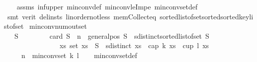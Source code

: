\begin{isabellebody}
%
\isadelimproof
\ \ %
\endisadelimproof
%
\isatagproof
{}\isamarkupfalse%
\ assms\ inf{\isacharunderscore}{\kern0pt}upper\ min{\isacharunderscore}{\kern0pt}conv{\isacharunderscore}{\kern0pt}def\ min{\isacharunderscore}{\kern0pt}conv{\isacharunderscore}{\kern0pt}leImpe\ min{\isacharunderscore}{\kern0pt}conv{\isacharunderscore}{\kern0pt}set{\isacharunderscore}{\kern0pt}def\isanewline
\ \ \isamarkupfalse%
\ {\isacharparenleft}{\kern0pt}smt\ {\isacharparenleft}{\kern0pt}verit{\isacharcomma}{\kern0pt}\ del{\isacharunderscore}{\kern0pt}insts{\isacharparenright}{\kern0pt}\ linorder{\isacharunderscore}{\kern0pt}not{\isacharunderscore}{\kern0pt}less\ mem{\isacharunderscore}{\kern0pt}Collect{\isacharunderscore}{\kern0pt}eq\ sorted{\isacharunderscore}{\kern0pt}list{\isacharunderscore}{\kern0pt}of{\isacharunderscore}{\kern0pt}set{\isachardot}{\kern0pt}sorted{\isacharunderscore}{\kern0pt}sorted{\isacharunderscore}{\kern0pt}key{\isacharunderscore}{\kern0pt}list{\isacharunderscore}{\kern0pt}of{\isacharunderscore}{\kern0pt}set{\isacharparenright}{\kern0pt}%
\endisatagproof
{\isafoldproof}%
%
\isadelimproof
\isanewline
%
\endisadelimproof
\isanewline
{}\isamarkupfalse%
\ min{\isacharunderscore}{\kern0pt}conv{\isacharunderscore}{\kern0pt}num{\isacharunderscore}{\kern0pt}out{\isacharunderscore}{\kern0pt}set{\isacharcolon}{\kern0pt}\isanewline
\ \ \ {\isachardoublequoteopen}{\isasymexists}S{\isachardot}{\kern0pt}\ \ \ \ \ \ \ \ \ card\ S\ {\isasymge}\ n\ {\isasymand}\ general{\isacharunderscore}{\kern0pt}pos\ S\ {\isasymand}\ sdistinct{\isacharparenleft}{\kern0pt}sorted{\isacharunderscore}{\kern0pt}list{\isacharunderscore}{\kern0pt}of{\isacharunderscore}{\kern0pt}set\ S{\isacharparenright}{\kern0pt}\ {\isasymand}\ \isanewline
\ \ \ \ \ \ \ \ \ \ \ \ \ \ \ \ {\isacharparenleft}{\kern0pt}{\isasymforall}xs{\isachardot}{\kern0pt}\ set\ xs\ {\isasymsubseteq}\ S\ {\isasymand}\ sdistinct\ xs\ {\isasymlongrightarrow}\ {\isasymnot}{\isacharparenleft}{\kern0pt}cap\ k\ xs\ {\isasymor}\ cup\ l\ xs{\isacharparenright}{\kern0pt}{\isacharparenright}{\kern0pt}{\isachardoublequoteclose}\isanewline
\ \ \ \ \ {\isachardoublequoteopen}n\ {\isasymnotin}\ min{\isacharunderscore}{\kern0pt}conv{\isacharunderscore}{\kern0pt}set\ k\ l{\isachardoublequoteclose}\isanewline
%
\isadelimproof
\ \ %
\endisadelimproof
%
\isatagproof
{}\isamarkupfalse%
\ min{\isacharunderscore}{\kern0pt}conv{\isacharunderscore}{\kern0pt}set{\isacharunderscore}{\kern0pt}def\ \isamarkupfalse%

\end{isabellebody}
